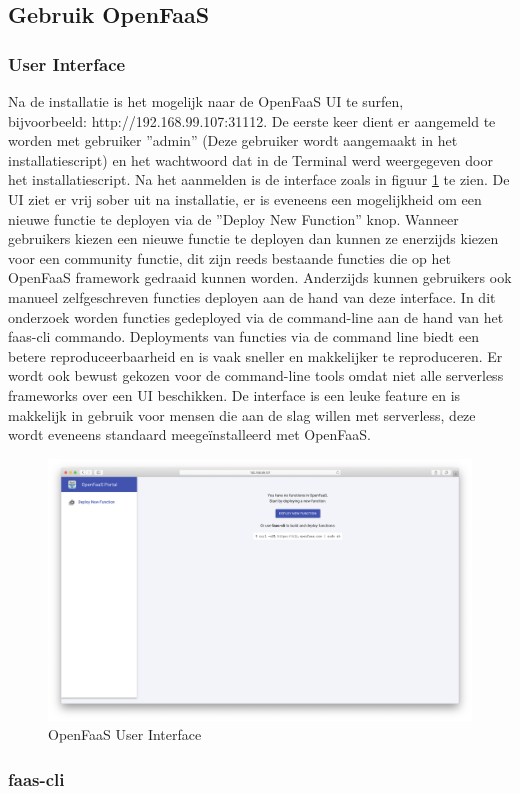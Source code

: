 \subsection{Gebruik OpenFaaS}
\subsubsection{User Interface}
Na de installatie is het mogelijk naar de OpenFaaS UI te surfen, \\bijvoorbeeld: http://192.168.99.107:31112. 
De eerste keer dient er aangemeld te worden met gebruiker ''admin'' (Deze gebruiker wordt aangemaakt in het installatiescript) en het wachtwoord dat in de Terminal werd weergegeven door het installatiescript. Na het aanmelden is de interface zoals in figuur \ref{fig:openfaas-ui} te zien. De UI ziet er vrij sober uit na installatie, er is eveneens een mogelijkheid om een nieuwe functie te deployen via de ''Deploy New Function'' knop. Wanneer gebruikers kiezen een nieuwe functie te deployen dan kunnen ze enerzijds kiezen voor een community functie, dit zijn reeds bestaande functies die op het OpenFaaS framework gedraaid kunnen worden. Anderzijds kunnen gebruikers ook manueel zelfgeschreven functies deployen aan de hand van deze interface. In dit onderzoek worden functies gedeployed via de command-line aan de hand van het faas-cli commando. Deployments van functies via de command line biedt een betere reproduceerbaarheid en is vaak sneller en makkelijker te reproduceren. Er wordt ook bewust gekozen voor de command-line tools omdat niet alle serverless frameworks over een UI beschikken. De interface is een leuke feature en is makkelijk in gebruik voor mensen die aan de slag willen met serverless, deze wordt eveneens standaard meegeïnstalleerd met OpenFaaS.
\begin{figure}
    \includegraphics[width=1\textwidth]{img/openfaas-ui.png}
    \caption{OpenFaaS User Interface}
    \label{fig:openfaas-ui}  
\end{figure}

\subsubsection{faas-cli}
